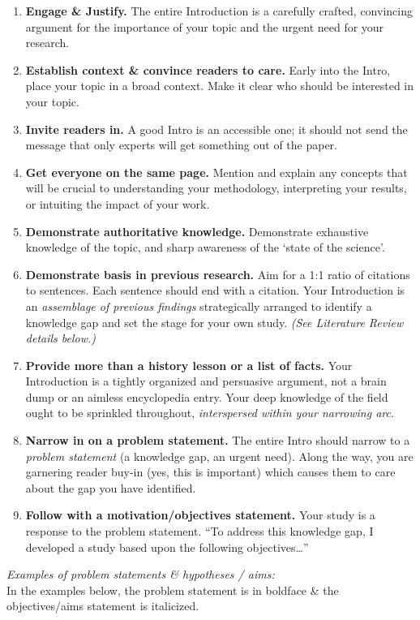 \documentclass[
]{book}
\begin{document}
\begin{enumerate}
\def\labelenumi{\arabic{enumi}.}
\item
  \textbf{Engage \& Justify.} The entire Introduction is a carefully crafted, convincing argument for the importance of your topic and the urgent need for your research.
\item
  \textbf{Establish context \& convince readers to care.} Early into the Intro, place your topic in a broad context. Make it clear who should be interested in your topic.
\item
  \textbf{Invite readers in.} A good Intro is an accessible one; it should not send the message that only experts will get something out of the paper.
\item
  \textbf{Get everyone on the same page.} Mention and explain any concepts that will be crucial to understanding your methodology, interpreting your results, or intuiting the impact of your work.
\item
  \textbf{Demonstrate authoritative knowledge.} Demonstrate exhaustive knowledge of the topic, and sharp awareness of the `state of the science'.
\item
  \textbf{Demonstrate basis in previous research.} Aim for a 1:1 ratio of citations to sentences. Each sentence should end with a citation. Your Introduction is an \emph{assemblage of previous findings} strategically arranged to identify a knowledge gap and set the stage for your own study. \emph{(See Literature Review details below.)}
\item
  \textbf{Provide more than a history lesson or a list of facts.} Your Introduction is a tightly organized and persuasive argument, not a brain dump or an aimless encyclopedia entry. Your deep knowledge of the field ought to be sprinkled throughout, \emph{interspersed within your narrowing arc}.
\item
  \textbf{Narrow in on a problem statement.} The entire Intro should narrow to a \emph{problem statement} (a knowledge gap, an urgent need). Along the way, you are garnering reader buy-in (yes, this is important) which causes them to care about the gap you have identified.
\item
  \textbf{Follow with a motivation/objectives statement.} Your study is a response to the problem statement. ``To address this knowledge gap, I developed a study based upon the following objectives\ldots{}''
\end{enumerate}

\emph{Examples of problem statements \& hypotheses / aims:}\\
In the examples below, the problem statement is in boldface \& the objectives/aims statement is italicized.
\end{document}
